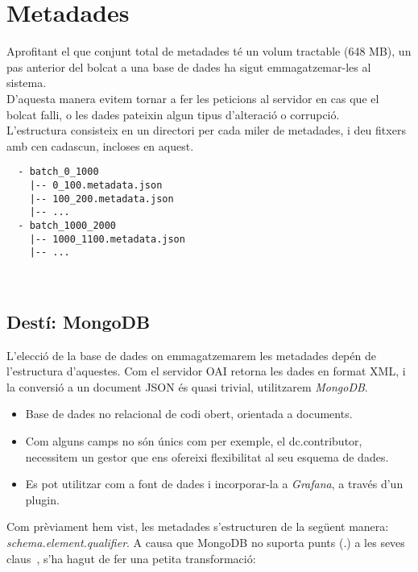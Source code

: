 \section{Metadades}\label{sec:metadata-storing}

Aprofitant el que conjunt total de metadades té un volum tractable (648 MB), un pas anterior del bolcat a una base de dades ha sigut emmagatzemar-les al sistema. \\

\noindent
D’aquesta manera evitem tornar a fer les peticions al servidor en cas que el bolcat falli, o les dades pateixin algun tipus d’alteració o corrupció. \\

\noindent
L’estructura consisteix en un directori per cada miler de metadades, i deu fitxers amb cen cadascun, incloses en aquest.

\begin{verbatim}
  - batch_0_1000
    |-- 0_100.metadata.json
    |-- 100_200.metadata.json
    |-- ...
  - batch_1000_2000
    |-- 1000_1100.metadata.json
    |-- ...
\end{verbatim}

\noindent \\
\subsection{Destí: MongoDB}\label{subsec:metadata-db-mongodb}

L'elecció de la base de dades on emmagatzemarem les metadades depén de l'estructura d'aquestes.
Com el servidor \gls{OAI} retorna les dades en format \gls{XML}, i la conversió a un document \gls{JSON} és quasi trivial, utilitzarem \textit{MongoDB}.

\begin{itemize}
  \item Base de dades no relacional de codi obert, orientada a documents.
  \item Com alguns camps no són únics com per exemple, el dc.contributor, necessitem un gestor que ens ofereixi flexibilitat al seu esquema de dades.
  \item Es pot utilitzar com a font de dades i incorporar-la a \textit{Grafana}, a través d’un \gls{plugin}.
\end{itemize}

\noindent
Com prèviament hem vist, les metadades s’estructuren de la següent manera: \textit{schema.element.qualifier}.
A causa que MongoDB no suporta punts (.) a les seves claus~\cite{mongodb:key-restrictions}, s’ha hagut de fer una petita transformació:

